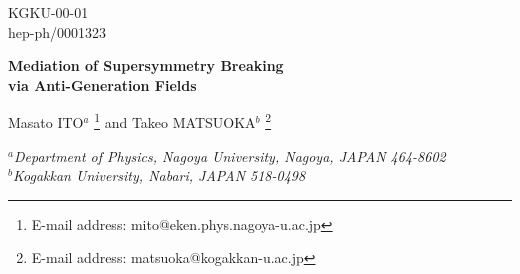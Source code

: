 


\setlength{\textwidth}{152mm} 
\setlength{\textheight}{210mm} 
\setlength{\oddsidemargin}{10mm} 
\setlength{\evensidemargin}{10mm} 
\setlength{\topmargin}{0mm} 

\def\lsim{\mathrel{\lower2.5pt\vbox{\lineskip=0pt\baselineskip=0pt 
           \hbox{$<$}\hbox{$\sim$}}}} 
\def\gsim{\mathrel{\lower2.5pt\vbox{\lineskip=0pt\baselineskip=0pt 
           \hbox{$>$}\hbox{$\sim$}}}} 





 


\begin{flushright}
KGKU-00-01 \\ hep-ph/0001323
\end{flushright}

\vspace{10mm}

\begin{center}
{\large \bf Mediation of Supersymmetry Breaking \\
via Anti-Generation Fields}

\vspace{20mm}

Masato ITO$^a$ 
            \footnote{E-mail address: mito@eken.phys.nagoya-u.ac.jp}
and Takeo MATSUOKA$^b$ 
            \footnote{E-mail address: matsuoka@kogakkan-u.ac.jp}
\end{center}





\begin{center}
{
\it 
{}$^a$Department of Physics, Nagoya University, Nagoya, 
JAPAN 464-8602 \\
{}$^b$Kogakkan University, Nabari, JAPAN 518-0498 
}
\end{center}

